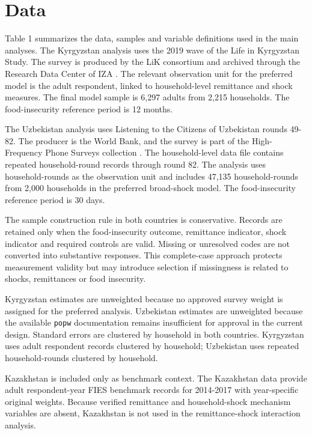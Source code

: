 \documentclass[11pt]{article}
\begin{document}
\section{Data}

Table 1 summarizes the data, samples and variable definitions used in the main analyses. The Kyrgyzstan analysis uses the 2019 wave of the Life in Kyrgyzstan Study. The survey is produced by the LiK consortium and archived through the Research Data Center of IZA \parencite{LIK2023}. The relevant observation unit for the preferred model is the adult respondent, linked to household-level remittance and shock measures. The final model sample is 6,297 adults from 2,215 households. The food-insecurity reference period is 12 months.

The Uzbekistan analysis uses Listening to the Citizens of Uzbekistan rounds 49-82. The producer is the World Bank, and the survey is part of the High-Frequency Phone Surveys collection \parencite{WorldBank2025a}. The household-level data file contains repeated household-round records through round 82. The analysis uses household-rounds as the observation unit and includes 47,135 household-rounds from 2,000 households in the preferred broad-shock model. The food-insecurity reference period is 30 days.

The sample construction rule in both countries is conservative. Records are retained only when the food-insecurity outcome, remittance indicator, shock indicator and required controls are valid. Missing or unresolved codes are not converted into substantive responses. This complete-case approach protects measurement validity but may introduce selection if missingness is related to shocks, remittances or food insecurity.

Kyrgyzstan estimates are unweighted because no approved survey weight is assigned for the preferred analysis. Uzbekistan estimates are unweighted because the available \texttt{popw} documentation remains insufficient for approval in the current design. Standard errors are clustered by household in both countries. Kyrgyzstan uses adult respondent records clustered by household; Uzbekistan uses repeated household-rounds clustered by household.

Kazakhstan is included only as benchmark context. The Kazakhstan data provide adult respondent-year FIES benchmark records for 2014-2017 with year-specific original weights. Because verified remittance and household-shock mechanism variables are absent, Kazakhstan is not used in the remittance-shock interaction analysis.
\end{document}
